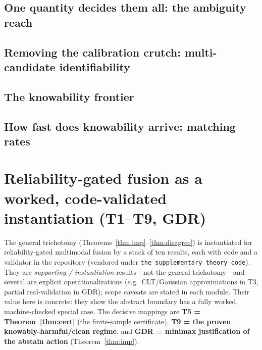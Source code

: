 \documentclass[11pt]{article}
\theoremstyle{plain}
\theoremstyle{definition}
\begin{document}
\subsection{One quantity decides them all: the ambiguity reach}\label{sec:unify}


\subsection{Removing the calibration crutch: multi-candidate identifiability}\label{sec:multicand}


\subsection{The knowability frontier}\label{sec:frontier}


\subsection{How fast does knowability arrive: matching rates}\label{sec:rates}




\section{Reliability-gated fusion as a worked, code-validated instantiation (T1--T9, GDR)}
\label{app:stack}
The general trichotomy (Theorems~\ref{thm:imp}--\ref{thm:disagree}) is instantiated for
reliability-gated multimodal fusion by a stack of ten results, each with code and a
validator in the repository (vendored under
\texttt{the supplementary theory code}). They are \emph{supporting /
instantiation} results---not the general trichotomy---and several are explicit
operationalizations (e.g.\ CLT/Gaussian approximations in T3, partial real-validation in
GDR); scope caveats are stated in each module. Their value here is concrete: they show
the abstract boundary has a fully worked, machine-checked special case. The decisive
mappings are \textbf{T5 = Theorem~\ref{thm:cert}} (the finite-sample certificate),
\textbf{T9 = the proven knowably-harmful/clean regime}, and \textbf{GDR = minimax
justification of the abstain action} (Theorem~\ref{thm:imp}).
\end{document}
